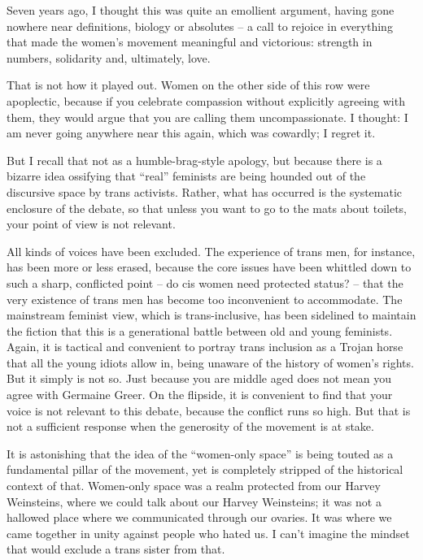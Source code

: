 Seven years ago, I thought this was quite an emollient argument, having gone nowhere near definitions, biology or absolutes – a call to rejoice in everything that made the women’s movement meaningful and victorious: strength in numbers, solidarity and, ultimately, love.

That is not how it played out. Women on the other side of this row were apoplectic, because if you celebrate compassion without explicitly agreeing with them, they would argue that you are calling them uncompassionate. I thought: I am never going anywhere near this again, which was cowardly; I regret it.

But I recall that not as a humble-brag-style apology, but because there is a bizarre idea ossifying that “real” feminists are being hounded out of the discursive space by trans activists. Rather, what has occurred is the systematic enclosure of the debate, so that unless you want to go to the mats about toilets, your point of view is not relevant.

All kinds of voices have been excluded. The experience of trans men, for instance, has been more or less erased, because the core issues have been whittled down to such a sharp, conflicted point – do cis women need protected status? – that the very existence of trans men has become too inconvenient to accommodate. The mainstream feminist view, which is trans-inclusive, has been sidelined to maintain the fiction that this is a generational battle between old and young feminists. Again, it is tactical and convenient to portray trans inclusion as a Trojan horse that all the young idiots allow in, being unaware of the history of women’s rights. But it simply is not so. Just because you are middle aged does not mean you agree with Germaine Greer. On the flipside, it is convenient to find that your voice is not relevant to this debate, because the conflict runs so high. But that is not a sufficient response when the generosity of the movement is at stake.

It is astonishing that the idea of the “women-only space” is being touted as a fundamental pillar of the movement, yet is completely stripped of the historical context of that. Women-only space was a realm protected from our Harvey Weinsteins, where we could talk about our Harvey Weinsteins; it was not a hallowed place where we communicated through our ovaries. It was where we came together in unity against people who hated us. I can’t imagine the mindset that would exclude a trans sister from that.

